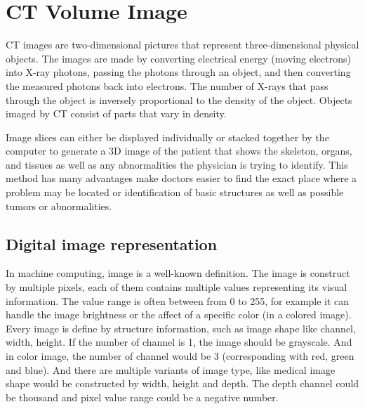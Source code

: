 \section{CT Volume Image}
CT images are two-dimensional pictures that represent three-dimensional physical objects. The images are made by converting electrical energy (moving electrons) into X-ray photons, passing the photons through an object, and then converting the measured photons back into electrons. The number of X-rays that pass through the object is inversely proportional to the density of the object. Objects imaged by CT consist of parts that vary in density. 

Image slices can either be displayed individually or stacked together by the computer to generate a 3D image of the patient that shows the skeleton, organs, and tissues as well as any abnormalities the physician is trying to identify. This method has many advantages make doctors easier to find the exact place where a problem may be located or identification of basic structures as well as possible tumors or abnormalities.

\subsection{Digital image representation}
In machine computing, image is a well-known definition. The image is construct by multiple pixels, each of them contains multiple values representing its visual information. The value range is often between from 0 to 255, for example it can handle the image brightness or the affect of a specific color (in a colored image). 
Every image is define by structure information, such as image shape like channel, width, height. If the number of channel is 1, the image should be grayscale. And in color image, the number of channel would be 3 (corresponding with red, green and blue). And there are multiple variants of image type, like medical image shape would be constructed by width, height and depth. The depth channel could be thousand and pixel value range could be a negative number.

